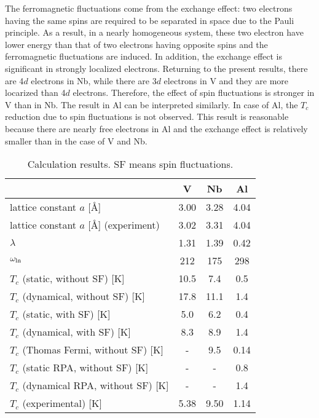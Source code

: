 The ferromagnetic fluctuations come from the exchange effect\cite{Berk1966}: two electrons having the 
same spins are 
required to be separated in space due to the Pauli principle. As a result, in a 
nearly homogeneous system, these two electron have lower energy than that of two electrons having 
opposite spins and the ferromagnetic fluctuations are induced.
In addition, the exchange effect is significant in strongly localized electrons.
Returning to the present results, there are 4$d$ electrons in Nb, while there are 3$d$ electrons 
in V and they are more locarized than 4$d$ electrons. Therefore, the effect of spin fluctuations
is stronger in V than in Nb.
The result in Al can be interpreted similarly. In case of Al, the $T_c$ reduction due to spin fluctuations
is not observed. This result is reasonable because there are nearly free electrons in Al and the
exchange effect is relatively smaller than in the case of V and Nb.
%
\begin{table}[htbp]
	\centering
	\caption{Calculation results. SF means spin fluctuations.} 
	\begin{tabular}{lccc}
		\hline \hline
		& V & Nb & Al \\
		\hline
		lattice constant $a$ [\AA] & 3.00 & 3.28 & 4.04 \\
		lattice constant $a$ [\AA] (experiment) & 3.02\cite{Kuentzler1985} & 3.31\cite{Laesser1985} & 4.04\cite{Sumiyama1990} \\
		\hline
		$\lambda$ & 1.31 & 1.39 & 0.42 \\
		$\omega_{\rm ln}$ & 212 & 175 & 298 \\
		\hline
		$T_c$ (static, without SF) [K] & 10.5 & 7.4 & 0.5 \\
		$T_c$ (dynamical, without SF) [K] & 17.8 & 11.1 & 1.4 \\
		$T_c$ (static, with SF) [K] & 5.0 & 6.2 & 0.4 \\
		$T_c$ (dynamical, with SF) [K] & 8.3 & 8.9 & 1.4 \\
		$T_c$ (Thomas Fermi, without SF) [K] & - & 9.5\cite{Luders2005} & 0.14\cite{Luders2005} \\
		$T_c$ (static RPA, without SF) [K] & - & - & 0.8\cite{RA2013} \\
		$T_c$ (dynamical RPA, without SF) [K] & - & - & 1.4\cite{RA2013} \\
		$T_c$ (experimental)\cite{Ashcroft} [K] & 5.38 & 9.50 & 1.14 \\
		\hline \hline
	\end{tabular}
	\label{tab:results}
\end{table}
%

